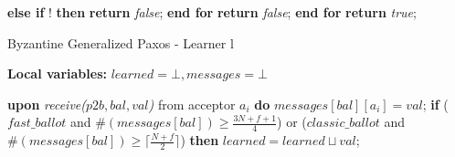 \begin{algorithm}
\begin{algorithmic}[1]
					\State \hspace{\algorithmicindent}\hspace{\algorithmicindent} \textbf{else if} ! \textbf{then}
						\State\hspace{\algorithmicindent}\hspace{\algorithmicindent}\hspace{\algorithmicindent} \textbf{return} \textit{false};
				\State \hspace{\algorithmicindent}\textbf{end for}
				\State \hspace{\algorithmicindent}\textbf{return} \textit{false};
			\State \textbf{end for}
			\State
			\State \textbf{return} \textit{true};
		\EndFunction
		
		
	\end{algorithmic}
\end{algorithm}

\begin{algorithm}
	\caption{Byzantine Generalized Paxos - Learner l}
	\textbf{Local variables: } $learned = \bot, messages = \bot$ 
	\begin{algorithmic}[1]
		\State \textbf{upon} \textit{receive($p2b, bal, val$)} from acceptor $a_i$ \textbf{do}
		\State \hspace{\algorithmicindent} $messages[bal][a_i] = val$;
		\State \hspace{\algorithmicindent} \textbf{if} {($fast\_ballot$ and $\#(messages[bal]) \geq \frac{3N+f+1}{4}$) or
			\State \hspace{\algorithmicindent} \hspace{\algorithmicindent}	($classic\_ballot$ and $\#(messages[bal]) \geq \lceil \frac{N+f}{2}\rceil$)} \textbf{then}
		\State \hspace{\algorithmicindent} \hspace{\algorithmicindent} \hspace{\algorithmicindent} $learned = learned \sqcup val$;
	\end{algorithmic}
\end{algorithm}
